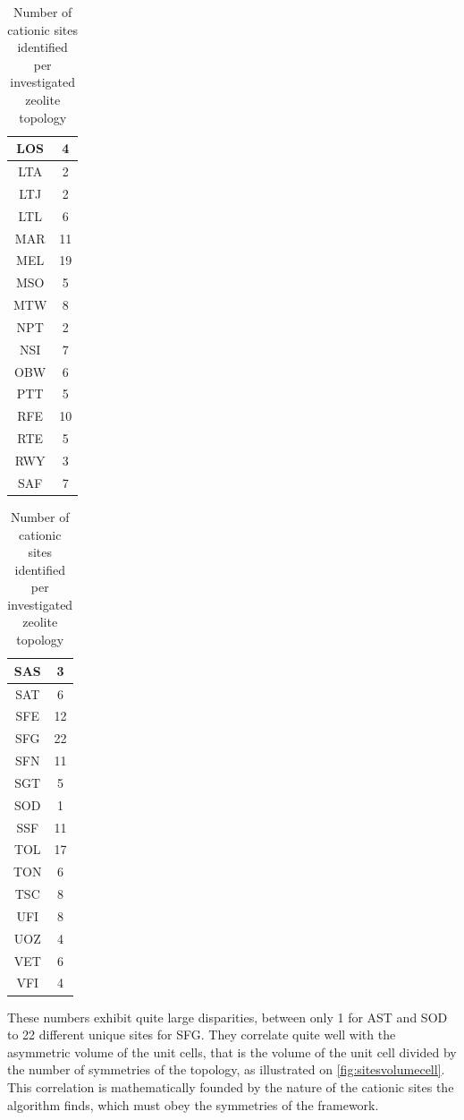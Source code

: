 \documentclass[main.tex]{subfiles}
\begin{document}
\begin{table}
\begin{minipage}[t]{0.24\linewidth}
\begin{tabular}{|c|c|}
LOS&4\\\hline
LTA&2\\\hline
LTJ&2\\\hline
LTL&6\\\hline
MAR&11\\\hline
MEL&19\\\hline
MSO&5\\\hline
MTW&8\\\hline
NPT&2\\\hline
NSI&7\\\hline
OBW&6\\\hline
PTT&5\\\hline
RFE&10\\\hline
RTE&5\\\hline
RWY&3\\\hline
SAF&7\\
\end{tabular}
\end{minipage}%
\begin{minipage}[t]{0.24\linewidth}
\vspace{0pt}\centering
\begin{tabular}{|c|c|}
SAS&3\\\hline
SAT&6\\\hline
SFE&12\\\hline
SFG&22\\\hline
SFN&11\\\hline
SGT&5\\\hline
SOD&1\\\hline
SSF&11\\\hline
TOL&17\\\hline
TON&6\\\hline
TSC&8\\\hline
UFI&8\\\hline
UOZ&4\\\hline
VET&6\\\hline
VFI&4\\\hline
\end{tabular}
\end{minipage}

	\caption{Number of cationic sites identified per investigated zeolite topology}\label{tab:numsites}
\end{table}

These numbers exhibit quite large disparities, between only 1 for AST and SOD to 22 different unique sites for SFG. They correlate quite well with the asymmetric volume of the unit cells, that is the volume of the unit cell divided by the number of symmetries of the topology, as illustrated on \cref{fig:sitesvolumecell}. This correlation is mathematically founded by the nature of the cationic sites the algorithm finds, which must obey the symmetries of the framework.
\end{document}
